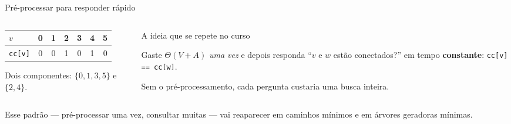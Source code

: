 \documentclass[aspectratio=169]{beamer}
\begin{document}
\begin{frame}{Pré-processar para responder rápido}
  \begin{columns}[T]
    \begin{column}{0.50\textwidth}
      \begin{center}
      {\scriptsize
      \begin{tabular}{lcccccc}
        \toprule
        $v$ & 0 & 1 & 2 & 3 & 4 & 5 \\
        \midrule
        \texttt{cc[v]} & 0 & 0 & 1 & 0 & 1 & 0 \\
        \bottomrule
      \end{tabular}}
      \end{center}
      \medskip
      {\scriptsize Dois componentes: $\{0,1,3,5\}$ e $\{2,4\}$.}
    \end{column}
    \begin{column}{0.46\textwidth}
      \begin{exampleblock}{A ideia que se repete no curso}
        {\scriptsize Gaste $\Theta(V+A)$ \emph{uma vez} e depois responda
        ``$v$ e $w$ estão conectados?'' em tempo \textbf{constante}:
        \texttt{cc[v] == cc[w]}.

        \medskip
        Sem o pré-processamento, cada pergunta custaria uma busca inteira.}
      \end{exampleblock}
    \end{column}
  \end{columns}
  \medskip
  {\scriptsize Esse padrão --- pré-processar uma vez, consultar muitas --- vai
  reaparecer em caminhos mínimos e em árvores geradoras mínimas.}
\end{frame}
\end{document}
